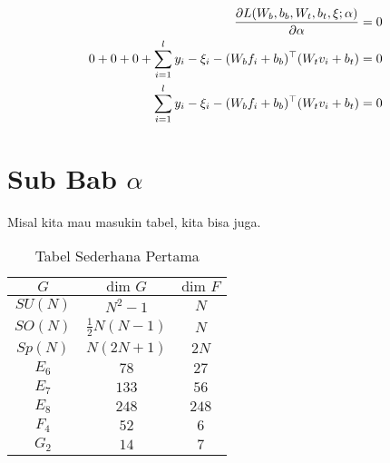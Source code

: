 \begin{equation}
  \begin{aligned}
    \pdv{L(W_b,b_b,W_t,b_t,\xi;\alpha)}{\alpha}                         & = 0 \\
    0 + 0 + 0 + \sum_{i=1}^{l}y_i-\xi_i-(W_b f_i+b_b)^\top(W_t v_i+b_t) & = 0 \\
    \sum_{i=1}^{l}y_i-\xi_i-(W_b f_i+b_b)^\top(W_t v_i+b_t)             & = 0
  \end{aligned}
\end{equation}




\section{Sub Bab \texorpdfstring{$\alpha$}{α}}
\noindent Misal kita mau masukin tabel, kita bisa juga.
\begin{table}[H]
  \caption{Tabel Sederhana Pertama}
  \label{co:tabel1}
  \begin{center}
    \begin{tabular}{ |c|c|c| }
      \hline
      $G$     & $\text{dim }G$      & $\text{dim }F$ \\
      \hline
      $SU(N)$ & $N^2 -1$            & $N$            \\
      $SO(N)$ & $\frac{1}{2}N(N-1)$ & $N$            \\
      $Sp(N)$ & $N(2N+1)$           & $2N$           \\
      $E_6$   & $78$                & $27$           \\
      $E_7$   & $133$               & $56$           \\
      $E_8$   & $248$               & $248$          \\
      $F_4$   & $52$                & $6$            \\
      $G_2$   & $14$                & $7$            \\
      \hline
    \end{tabular}
  \end{center}
\end{table}

